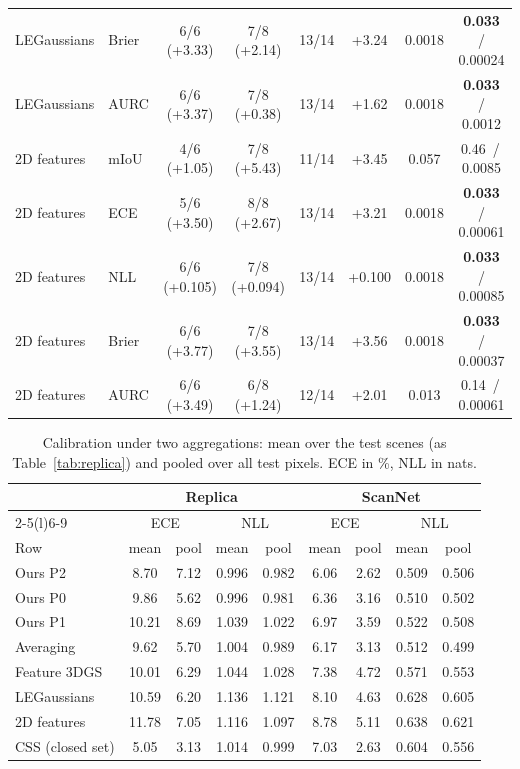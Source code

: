\documentclass[journal]{IEEEtran}
\begin{document}
\begin{table}[t]
\begin{tabular}{@{}llcccccc@{}}
LEGaussians & Brier & 6/6 (+3.33) & 7/8 (+2.14) & 13/14 & +3.24 & 0.0018 & \textbf{0.033} \,/\, 0.00024\\
LEGaussians & AURC & 6/6 (+3.37) & 7/8 (+0.38) & 13/14 & +1.62 & 0.0018 & \textbf{0.033} \,/\, 0.0012\\
\midrule
2D features & mIoU & 4/6 (+1.05) & 7/8 (+5.43) & 11/14 & +3.45 & 0.057 & 0.46 \,/\, 0.0085\\
2D features & ECE & 5/6 (+3.50) & 8/8 (+2.67) & 13/14 & +3.21 & 0.0018 & \textbf{0.033} \,/\, 0.00061\\
2D features & NLL & 6/6 (+0.105) & 7/8 (+0.094) & 13/14 & +0.100 & 0.0018 & \textbf{0.033} \,/\, 0.00085\\
2D features & Brier & 6/6 (+3.77) & 7/8 (+3.55) & 13/14 & +3.56 & 0.0018 & \textbf{0.033} \,/\, 0.00037\\
2D features & AURC & 6/6 (+3.49) & 6/8 (+1.24) & 12/14 & +2.01 & 0.013 & 0.14 \,/\, 0.00061\\
\bottomrule
\end{tabular}
\end{table}

\begin{table}[t]
\centering
\caption{Calibration under two aggregations: mean over the test scenes (as Table~\ref{tab:replica}) and pooled over all test pixels. ECE in \%, NLL in nats.}
\label{tab:calib}
\footnotesize
\setlength{\tabcolsep}{2.5pt}
\begin{tabular}{@{}lcccccccc@{}}
\toprule
& \multicolumn{4}{c}{Replica} & \multicolumn{4}{c}{ScanNet}\\
\cmidrule(lr){2-5}\cmidrule(l){6-9}
& \multicolumn{2}{c}{ECE} & \multicolumn{2}{c}{NLL} & \multicolumn{2}{c}{ECE} & \multicolumn{2}{c}{NLL}\\
Row & mean & pool & mean & pool & mean & pool & mean & pool\\
\midrule
Ours P2 & 8.70 & 7.12 & 0.996 & 0.982 & 6.06 & 2.62 & 0.509 & 0.506\\
Ours P0 & 9.86 & 5.62 & 0.996 & 0.981 & 6.36 & 3.16 & 0.510 & 0.502\\
Ours P1 & 10.21 & 8.69 & 1.039 & 1.022 & 6.97 & 3.59 & 0.522 & 0.508\\
Averaging & 9.62 & 5.70 & 1.004 & 0.989 & 6.17 & 3.13 & 0.512 & 0.499\\
Feature 3DGS & 10.01 & 6.29 & 1.044 & 1.028 & 7.38 & 4.72 & 0.571 & 0.553\\
LEGaussians & 10.59 & 6.20 & 1.136 & 1.121 & 8.10 & 4.63 & 0.628 & 0.605\\
2D features & 11.78 & 7.05 & 1.116 & 1.097 & 8.78 & 5.11 & 0.638 & 0.621\\
CSS (closed set) & 5.05 & 3.13 & 1.014 & 0.999 & 7.03 & 2.63 & 0.604 & 0.556\\
\bottomrule
\end{tabular}
\end{table}
\end{document}
